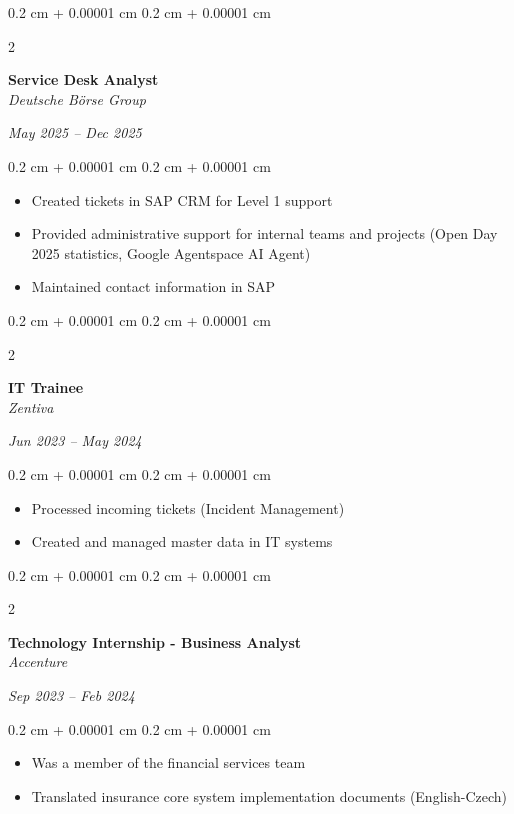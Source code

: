 \documentclass[10pt, letterpaper]{extarticle}
\newenvironment{highlights}{
    \begin{itemize}[
        topsep=0.10 cm,
        parsep=0.10 cm,
        partopsep=0pt,
        itemsep=0pt,
        leftmargin=0.4 cm + 10pt
    ]
}{
    \end{itemize}
} %
\newenvironment{onecolentry}{
    \begin{adjustwidth}{
        0.2 cm + 0.00001 cm
    }{
        0.2 cm + 0.00001 cm
    }
}{
    \end{adjustwidth}
} %
\newenvironment{twocolentry}[2][]{
    \onecolentry
    \def\secondColumn{#2}
    \setcolumnwidth{\fill, 4.5 cm}
    \begin{paracol}{2}
}{
    \switchcolumn \raggedleft \secondColumn
    \end{paracol}
    \endonecolentry
} %
\begin{document}
        \vspace{0.2 cm}
        \begin{twocolentry}{\textit{May 2025 – Dec 2025}}
            \textbf{Service Desk Analyst} \\
            \textit{Deutsche Börse Group}
        \end{twocolentry}
        
        \vspace{0.10 cm}
        \begin{onecolentry}
            \begin{highlights}
                \item Created tickets in SAP CRM for Level 1 support
                \item Provided administrative support for internal teams and projects (Open Day 2025 statistics, Google Agentspace AI Agent)
                \item Maintained contact information in SAP
            \end{highlights}
        \end{onecolentry}
        
        \vspace{0.2 cm}
        \begin{twocolentry}{\textit{Jun 2023 – May 2024}}
            \textbf{IT Trainee} \\
            \textit{Zentiva}
        \end{twocolentry}
        
        \vspace{0.10 cm}
        \begin{onecolentry}
            \begin{highlights}
                \item Processed incoming tickets (Incident Management)
                \item Created and managed master data in IT systems
            \end{highlights}
        \end{onecolentry}
        
        \vspace{0.2 cm}
        \begin{twocolentry}{\textit{Sep 2023 – Feb 2024}}
            \textbf{Technology Internship - Business Analyst} \\
            \textit{Accenture}
        \end{twocolentry}
        
        \vspace{0.10 cm}
        \begin{onecolentry}
            \begin{highlights}
                \item Was a member of the financial services team
                \item Translated insurance core system implementation documents (English-Czech)
            \end{highlights}
        \end{onecolentry}
\end{document}

